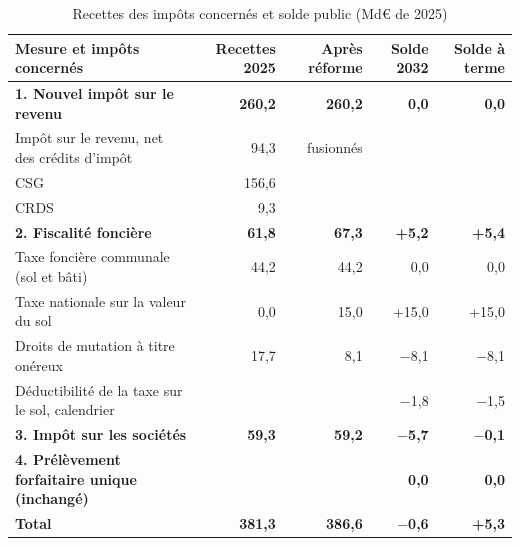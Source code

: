 \begin{table}[!htbp]\small\setlength{\tabcolsep}{4pt}
\caption{Recettes des impôts concernés et solde public (Md€ de 2025)}\label{tab:t1}
\begin{tabularx}{\linewidth}{@{}Xrrrr@{}}
\toprule
\textbf{Mesure et impôts concernés} & \textbf{Recettes 2025} & \textbf{Après réforme} & \textbf{Solde 2032} & \textbf{Solde à terme} \\
\midrule
\textbf{1. Nouvel impôt sur le revenu} & \textbf{260,2} & \textbf{260,2} & \textbf{0,0} & \textbf{0,0} \\
\quad Impôt sur le revenu, net des crédits d'impôt & 94,3 & fusionnés & & \\
\quad CSG & 156,6 & & & \\
\quad CRDS & 9,3 & & & \\
\textbf{2. Fiscalité foncière} & \textbf{61,8} & \textbf{67,3} & \textbf{+5,2} & \textbf{+5,4} \\
\quad Taxe foncière communale (sol et bâti) & 44,2 & 44,2 & 0,0 & 0,0 \\
\quad Taxe nationale sur la valeur du sol & 0,0 & 15,0 & +15,0 & +15,0 \\
\quad Droits de mutation à titre onéreux & 17,7 & 8,1 & $-$8,1 & $-$8,1 \\
\quad Déductibilité de la taxe sur le sol, calendrier & & & $-$1,8 & $-$1,5 \\
\textbf{3. Impôt sur les sociétés} & \textbf{59,3} & \textbf{59,2} & \textbf{$-$5,7} & \textbf{$-$0,1} \\
\textbf{4. Prélèvement forfaitaire unique (inchangé)} & & & \textbf{0,0} & \textbf{0,0} \\
\midrule \textbf{Total} & \textbf{381,3} & \textbf{386,6} & \textbf{$-$0,6} & \textbf{+5,3} \\
\bottomrule
\end{tabularx}
\par{}
\end{table}
